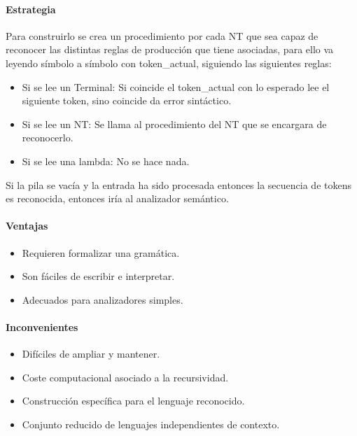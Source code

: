 \documentclass[12pt]{report} %
\begin{document}
\paragraph{Estrategia}

Para construirlo se crea un procedimiento por cada NT que sea capaz de
reconocer las distintas reglas de producción que tiene asociadas, para
ello va leyendo símbolo a símbolo con token\_actual, siguiendo las
siguientes reglas:

\begin{itemize}

\item
  Si se lee un Terminal: Si coincide el token\_actual con lo esperado
  lee el siguiente token, sino coincide da error sintáctico.
\item
  Si se lee un NT: Se llama al procedimiento del NT que se encargara de
  reconocerlo.
\item
  Si se lee una lambda: No se hace nada.
\end{itemize}

Si la pila se vacía y la entrada ha sido procesada entonces la secuencia
de tokens es reconocida, entonces iría al analizador semántico.


\paragraph{Ventajas}

\begin{itemize}

\item
  Requieren formalizar una gramática.
\item
  Son fáciles de escribir e interpretar.
\item
  Adecuados para analizadores simples.
\end{itemize}


\paragraph{Inconvenientes}

\begin{itemize}

\item
  Difíciles de ampliar y mantener.
\item
  Coste computacional asociado a la recursividad.
\item
  Construcción específica para el lenguaje reconocido.
\item
  Conjunto reducido de lenguajes independientes de contexto.
\end{itemize}
 
\end{document}
